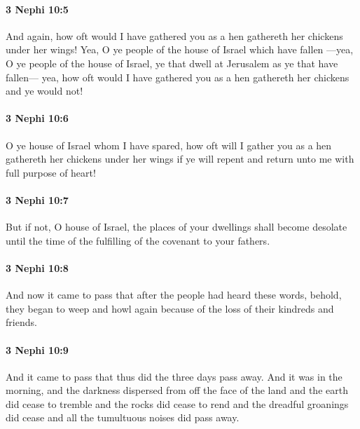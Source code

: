 		\paragraph{3 Nephi 10:5} %
			\label{3NEPHI-10-5}

			And again, how oft would I have gathered you
			as a hen gathereth her chickens under her wings!
			Yea, O ye people of the house of Israel which have fallen
			---yea, O ye people of the house of Israel,
			ye that dwell at Jerusalem as ye that have fallen---
			yea, how oft would I have gathered you
			as a hen gathereth her chickens
			and ye would not!

		\paragraph{3 Nephi 10:6} %
			\label{3NEPHI-10-6}

			O ye house of Israel whom I have spared,
			how oft will I gather you
			as a hen gathereth her chickens under her wings
			if ye will repent and return unto me with full purpose of heart!

		\paragraph{3 Nephi 10:7} %
			\label{3NEPHI-10-7}

			But if not, O house of Israel, the places of your dwellings shall become desolate
			until the time of the fulfilling of the covenant to your fathers.

		\paragraph{3 Nephi 10:8} %
			\label{3NEPHI-10-8}

			And now it came to pass that after the people had heard these words,
			behold, they began to weep and howl again
			because of the loss of their kindreds and friends.

		\paragraph{3 Nephi 10:9} %
			\label{3NEPHI-10-9}

			And it came to pass that thus did the three days pass away.
			And it was in the morning,
			and the darkness dispersed from off the face of the land
			and the earth did cease to tremble
			and the rocks did cease to rend
			and the dreadful groanings did cease
			and all the tumultuous noises did pass away.

